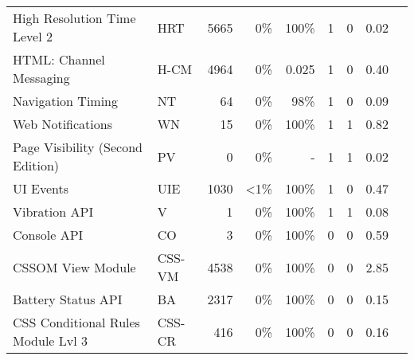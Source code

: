 \begin{table}[ht]
{\begin{tabular}{ l | l r r r | r r | r | l }
      High Resolution Time Level 2                        &  HRT         & 5665  & 0\%          & 100\% & 1   & 0  & 0.02  & \cite{gelernter2015cross,andrysco2015subnormal,oren2015spy,van2015clock,kotcher2013cross,ho2014tick,gruss2015practical,gras2017aslr} \\ %
      HTML: Channel Messaging                             &  H-CM        & 4964  & 0\%          & 0.025 & 1   & 0  & 0.40  & \cite{weissbacher2015zigzag,son2013postman} \\ %
      Navigation Timing                                   &  NT          & 64    & 0\%          & 98\%  & 1   & 0  & 0.09  & \\ %
      Web Notifications                                   &  WN          & 15    & 0\%          & 100\% & 1   & 1  & 0.82  & \\ %
      Page Visibility (Second Edition)                    &  PV          & 0     & 0\%          & -     & 1   & 1  & 0.02  & \\ %
      UI Events                                           &  UIE         & 1030  & \textless1\% & 100\% & 1   & 0  & 0.47  & \\ %
      Vibration API                                       &  V           & 1     & 0\%          & 100\% & 1   & 1  & 0.08  & \\ %
      Console API                                         &  CO          & 3     & 0\%          & 100\% & 0   & 0  & 0.59  & \cite{ho2014tick} \\ %
      CSSOM View Module                                   &  CSS-VM      & 4538  & 0\%          & 100\% & 0   & 0  & 2.85  & \cite{acar2013fpdetective} \\ %
      Battery Status API                                  &  BA          & 2317  & 0\%          & 100\% & 0   & 0  & 0.15  & \cite{englehardt2016online,alaca2016device,nikiforakis2013cookieless,olejnik2015leaking} \\ %
      CSS Conditional Rules Module Lvl 3                &  CSS-CR      & 416   & 0\%          & 100\% & 0   & 0  & 0.16  & \\ %

\end{tabular}}
\end{table}
